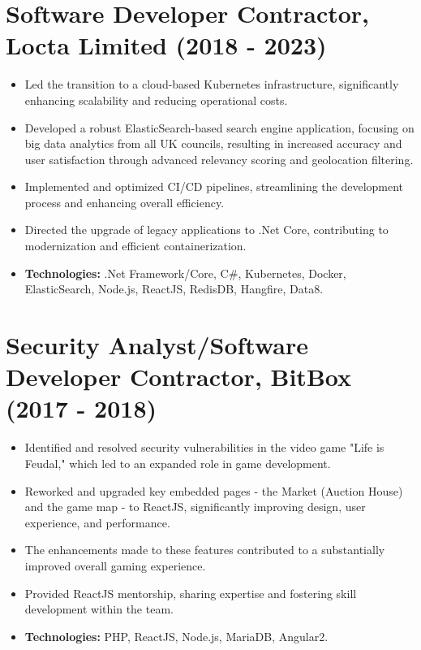 \documentclass[12pt,a4paper]{res}
\begin{document}
\begin{resume}
\section{\bf Software Developer Contractor, Locta Limited (2018 - 2023)}
\begin{itemize}
\item Led the transition to a cloud-based Kubernetes infrastructure, significantly enhancing scalability and reducing operational costs.
\item Developed a robust ElasticSearch-based search engine application, focusing on big data analytics from all UK councils, resulting in increased accuracy and user satisfaction through advanced relevancy scoring and geolocation filtering.
\item Implemented and optimized CI/CD pipelines, streamlining the development process and enhancing overall efficiency.
\item Directed the upgrade of legacy applications to .Net Core, contributing to modernization and efficient containerization.
\item \textbf{Technologies:} .Net Framework/Core, C\#, Kubernetes, Docker, ElasticSearch, Node.js, ReactJS, RedisDB, Hangfire, Data8.
\end{itemize}

\section{\bf Security Analyst/Software Developer Contractor, BitBox (2017 - 2018)}
\begin{itemize}
\item Identified and resolved security vulnerabilities in the video game "Life is Feudal," which led to an expanded role in game development.
\item Reworked and upgraded key embedded pages - the Market (Auction House) and the game map - to ReactJS, significantly improving design, user experience, and performance.
\item The enhancements made to these features contributed to a substantially improved overall gaming experience.
\item Provided ReactJS mentorship, sharing expertise and fostering skill development within the team.
\item \textbf{Technologies:} PHP, ReactJS, Node.js, MariaDB, Angular2.
\end{itemize}


\end{resume}
\end{document}
